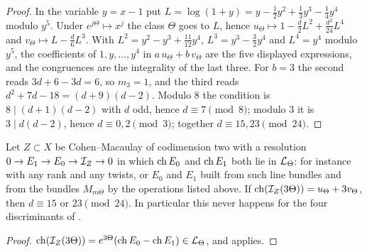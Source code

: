 \begin{proof}
In the variable $y=x-1$ put
$L=\log(1+y)=y-\tfrac12y^{2}+\tfrac13y^{3}-\tfrac14y^{4}$ modulo $y^{5}$.
Under $e^{j\Theta}\mapsto x^{j}$ the class $\Theta$ goes to $L$, hence
$u_{\Theta}\mapsto1-\tfrac d2L^{2}+\tfrac{d^{2}}{24}L^{4}$ and
$v_{\Theta}\mapsto L-\tfrac d6L^{3}$. With
$L^{2}=y^{2}-y^{3}+\tfrac{11}{12}y^{4}$, $L^{3}=y^{3}-\tfrac32y^{4}$ and
$L^{4}=y^{4}$ modulo $y^{5}$, the coefficients of $1,y,\dots,y^{4}$ in
$a\,u_{\Theta}+b\,v_{\Theta}$ are the five displayed expressions, and the
congruences are the integrality of the last three. For $b=3$ the second
reads $3d+6-3d=6$, so $m_{3}=1$, and the third reads
$d^{2}+7d-18=(d+9)(d-2)$. Modulo $8$ the condition is $8\mid(d+1)(d-2)$
with $d$ odd, hence $d\equiv7\pmod8$; modulo $3$ it is $3\mid d(d-2)$, hence
$d\equiv0,2\pmod3$; together $d\equiv15,23\pmod{24}$.
\end{proof}

\begin{corollary}
\label{cor:latticeburch}
Let $Z\subset X$ be Cohen--Macaulay of codimension two with a resolution
$0\to E_{1}\to E_{0}\to\mathcal{I}_{Z}\to0$ in which $\operatorname{ch} E_{0}$ and $\operatorname{ch} E_{1}$ both
lie in $\mathcal{L}_{\Theta}$: for instance  with any rank and any
twists, or $E_{0}$ and $E_{1}$ built from such line bundles and from the
bundles $M_{m\Theta}$ by the operations listed above. If
$\operatorname{ch}(\mathcal{I}_{Z}(3\Theta))=u_{\Theta}+3v_{\Theta}$, then $d\equiv15$ or
$23\pmod{24}$. In particular this never happens for the four discriminants
of .
\end{corollary}

\begin{proof}
$\operatorname{ch}(\mathcal{I}_{Z}(3\Theta))=e^{3\Theta}(\operatorname{ch} E_{0}-\operatorname{ch} E_{1})\in\mathcal{L}_{\Theta}$, and
 applies.
\end{proof}

